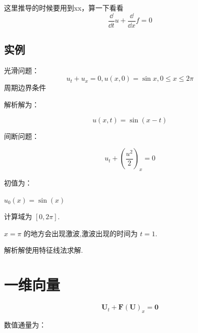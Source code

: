 \documentclass{book}
\begin{document}
这里推导的时候要用到xx，算一下看看
\begin{equation}
    \frac{\dd}{\dd t}u+\frac{\dd}{\dd x}f=0
\end{equation}

\subsection{实例}
\begin{example}{}{}
    光滑问题：
    \begin{equation}
        u_t+u_x=0,u(x,0)=\sin x,0\leqslant x\leqslant 2\pi
    \end{equation}
    周期边界条件

    解析解为：

    \begin{equation}
        u(x,t) = \sin(x-t)
    \end{equation}
\end{example}

\begin{example}{}{}
    间断问题：

    \begin{equation}
        u_{t}+\left(\frac{u^{2}}{2}\right)_{x}=0
    \end{equation}

    初值为：

    $u_0(x)=\sin(x)$

    计算域为 $[0,2\pi]$.

    $x=\pi$ 的地方会出现激波,激波出现的时间为 $t=1$.

    解析解使用特征线法求解.
\end{example}




\section{一维向量}

\begin{equation}
    \mathbf{U}_{t}+\mathbf{F}(\mathbf{U})_{x}=\mathbf{0}
\end{equation}

数值通量为：
\end{document}
